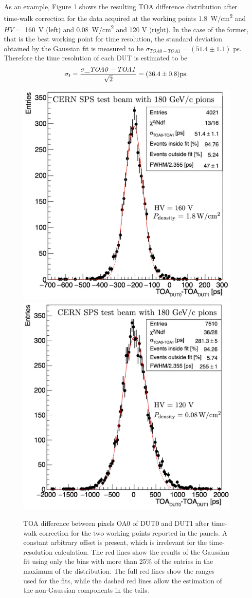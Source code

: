 		As an example, Figure \ref{im:ATTRACT_TOF} shows the resulting TOA difference distribution after time-walk correction for the data acquired at the working points \SI{1.8}{\watt/\centi\meter^2} and $ HV =$ \SI{160}{\volt} (left) and \SI{0.08}{\watt/\centi\meter^2} and 120 V (right).  In the case of the former, that is the best working point for time resolution, the standard deviation obtained by the Gaussian fit is measured to be $\sigma_{TOA0-TOA1}=(51.4 \pm 1.1)$ ps. 
		Therefore the time resolution of each DUT is estimated to be
		\begin{equation}
    		\sigma_{t} = \frac{\sigma\_{\it TOA0-TOA1}}{\sqrt{2}} = (36.4 \pm 0.8) \si{\pico\second}.
		\end{equation}
		\begin{figure}[h]
			\centering %
			\includegraphics[width=0.47\linewidth]{files/ATTRACT_paper/TimeRes_WP7_160V_Gauss}
			\qquad
			\includegraphics[width=0.47\linewidth]{files/ATTRACT_paper/TimeResolution_120V_7uA_Gauss}
			\caption{ TOA difference between pixels OA0 of DUT0 and DUT1 after time-walk correction for the two working points reported in the panels. A constant arbitrary offset is present, which is irrelevant for the time-resolution calculation. The  red lines show the results of the Gaussian fit using only the bins with more than 25\% of the entries in the maximum of the distribution. The full red lines show the ranges used for the fits, while the dashed red lines allow the estimation of the non-Gaussian components in the tails.}
			\label{im:ATTRACT_TOF}
		\end{figure}
		
